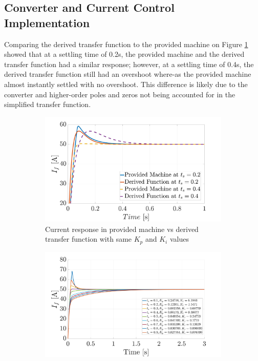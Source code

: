     \subsection{Converter and Current Control Implementation}
        
        Comparing the derived transfer function to the provided machine on Figure \ref{fig: provided comparison} showed that at a settling time of 0.2s, the provided machine and the derived transfer function had a similar response; however, at a settling time of 0.4s, the derived transfer function still had an overshoot where-as the provided machine almost instantly settled with no overshoot. This difference is likely due to the converter and higher-order poles and zeros not being accounted for in the simplified transfer function. 
        \begin{figure}[tbh!]
            \centering
            \begin{subfigure}{0.44\textwidth}
                \centering
                 \includegraphics[width=\linewidth]{PEMDT Exam Report/img/Provided vs Derived current.jpg}
                 \caption{Current response in provided machine vs derived transfer function with same \(K_p\) and \(K_i\) values}
                 \label{fig: provided comparison}
            \end{subfigure}
            \hfill
            \begin{subfigure}{0.54\textwidth}
                 \centering
                 \includegraphics[width=\linewidth]{PEMDT Exam Report/img/Current settling time graph.jpg}

\end{subfigure}
\end{figure}
